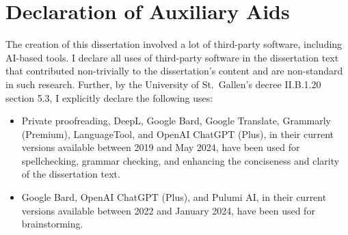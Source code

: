 
\chapter*{Declaration of Auxiliary Aids}

The creation of this dissertation involved a lot of third-party software, including AI-based tools.
I declare all uses of third-party software in the dissertation text that contributed non-trivially to the dissertation's content and are non-standard in such research.
Further, by the University of St.\ Gallen's decree II.B.1.20 section 5.3, I explicitly declare the following uses:

\begin{itemize}
    \item Private proofreading, DeepL, Google Bard, Google Translate, Grammarly (Premium), LanguageTool, and OpenAI ChatGPT (Plus),
    in their current versions available between 2019 and May 2024,
     have been used for spellchecking, grammar checking, and enhancing the conciseness and clarity of the dissertation text.
    \item Google Bard, OpenAI ChatGPT (Plus), and Pulumi AI,
    in their current versions available between 2022 and January 2024,
    have been used for brainstorming.
\end{itemize}
